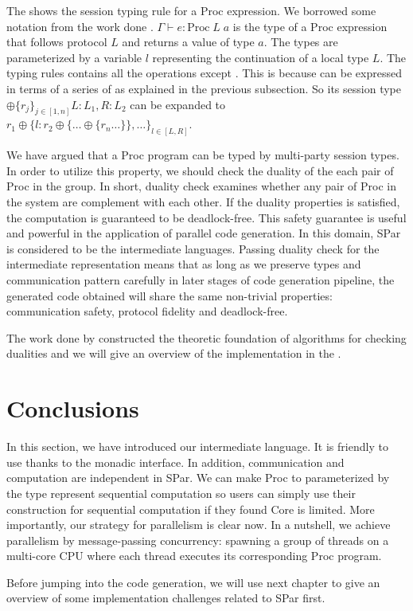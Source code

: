 The  shows the session typing rule for a Proc expression. We borrowed some notation from the work done \cite{AlgebraicMultipartyProtocol}. $\Gamma \vdash e : \text{Proc} \; L \; a$ is the type of a Proc expression that follows protocol $L$ and returns a value of type $a$. The types are parameterized by a variable $l$ representing the continuation of a local type $L$. The typing rules contains all the operations except . This is because  can be expressed in terms of a series of  as explained in the previous subsection. So its session type $\oplus \{r_j\}_{j \in [1,n]} {L:L_1, R: L_2}$ can be expanded to $r_1 \oplus \{l: r_2 \oplus \{\ldots \oplus\{r_n \ldots\}\},\ldots\}_{l \in [L, R]}$. 

We have argued that a Proc program can be typed by multi-party session types. In order to utilize this property, we should check the duality of the each pair of Proc in the group. In short, duality check examines whether any pair of Proc in the system are complement with each other. If the duality properties is satisfied, the computation is guaranteed to be deadlock-free. This safety guarantee is useful and powerful in the application of parallel code generation. In this domain, SPar is considered to be the intermediate languages. Passing duality check for the intermediate representation means that as long as we preserve types and communication pattern carefully in later stages of code generation pipeline, the generated code obtained will share the same non-trivial properties: communication safety, protocol fidelity and deadlock-free.

The work done by \cite{coppoGentleIntroductionMultiparty2015} constructed the theoretic foundation of algorithms for checking dualities and we will give an overview of the implementation in the .

\section{Conclusions}
In this section, we have introduced our intermediate language. It is friendly to use thanks to the monadic interface. In addition, communication and computation are independent in SPar. We can make Proc to parameterized by the type represent sequential computation so users can simply use their construction for sequential computation if they found Core is limited. More importantly, our strategy for parallelism is clear now. In a nutshell, we achieve parallelism by message-passing concurrency: spawning a group of threads on a multi-core CPU where each thread executes its corresponding Proc program.

Before jumping into the code generation, we will use next chapter to give an overview of some implementation challenges related to SPar first.
